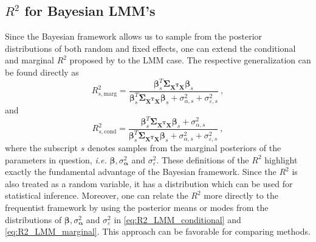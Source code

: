 \subsection{$R^2$ for Bayesian LMM's}
\label{sec:bayes_R2_LMM}
Since the Bayesian framework allows us to sample from the posterior distributions of both random and fixed effects, one can extend the conditional and marginal $R^2$ proposed by \citet{gelman2017rsquared} to the LMM case. 
The respective generalization can be found directly as
\begin{equation}
    \label{eq:R2_bayes_LMM_cond}
    R_{s, \text{marg}}^2 = \frac{\boldsymbol{\beta}_s^T \boldsymbol{\Sigma_{\mathbf{X^TX}}}\boldsymbol{\beta}_s}{\boldsymbol{\beta}_s^T \boldsymbol{\Sigma_{\mathbf{X^TX}}}\boldsymbol{\beta}_s + \sigma_{\alpha, s}^2 + \sigma_{\varepsilon, s}^2} \ ,
\end{equation} 
and
\begin{equation}
    \label{eq:R2_bayes_LMM_marg}
    R_{s, \text{cond}}^2 = \frac{\boldsymbol{\beta}_s^T \boldsymbol{\Sigma_{\mathbf{X^TX}}}\boldsymbol{\beta}_s + \sigma_{\alpha, s}^2}{\boldsymbol{\beta}_s^T \boldsymbol{\Sigma_{\mathbf{X^TX}}}\boldsymbol{\beta}_s + \sigma_{\alpha, s}^2 + \sigma_{\varepsilon, s}^2} \ ,
\end{equation}
where the subscript $s$ denotes samples from the marginal posteriors of the parameters in question, \textit{i.e.} $\boldsymbol{\beta}, \sigma_{\boldsymbol{\alpha}}^2$ and $\sigma_{\varepsilon}^2$.
These definitions of the $R^2$ highlight exactly the fundamental advantage of the Bayesian framework. Since the $R^2$ is also treated as a random variable, it has a distribution which can be used for statistical inference. 
Moreover, one can relate the $R^2$ more directly to the frequentist framework by using the posterior means or modes from the distributions of $\boldsymbol{\beta}, \sigma_{\boldsymbol{\alpha}}^2$ and $\sigma_{\varepsilon}^2$ in \eqref{eq:R2_LMM_conditional} and \eqref{eq:R2_LMM_marginal}. This approach can be favorable for comparing methods.

